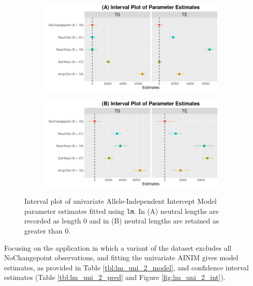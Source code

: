 \begin{figure}[H]
\vspace{0.5cm}
     \begin{subfigure}[t]{.49\textwidth}
      \centering
      \includegraphics[width = 1\textwidth]{../figures/Chapter_5/Univariate_lm_7_AI_Interval.png}
    \end{subfigure}%
     \begin{subfigure}[t]{.49\textwidth}
      \centering
       \includegraphics[width = 1\textwidth]{../figures/Chapter_5/Univariate_lm_7_Neut_AI_Interval.png}
    \end{subfigure} 
     \caption[Interval plot of univariate Allele-Independent Intercept Model parameter estimates fitted using \texttt{lm()}.]{Interval plot of univariate Allele-Independent Intercept Model parameter estimates fitted using \texttt{lm}. In (A) neutral lengths are recorded as length 0 and in (B) neutral lengths are retained as greater than 0.}
     \label{fig:lm_uni_1_int}
\end{figure}

Focusing on the application in which a variant of the dataset excludes all NoChangepoint observations, and fitting the univariate AINIM gives model estimates, as provided in Table \ref{tbl:lm_uni_2_model}, and confidence interval estimates (Table \ref{tbl:lm_uni_2_pred} and Figure  \ref{fig:lm_uni_2_int}).

